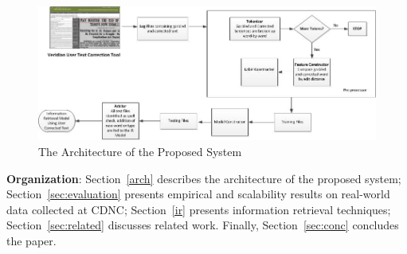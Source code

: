 \documentclass[letterpaper]{article}
\begin{document}
\begin{figure}[t]
\centering
\includegraphics[width=0.8\textheight]{./image/archOCR.jpg}
\caption{The Architecture of the Proposed System}
\label{fig:arch}
\end{figure}



\noindent \textbf{Organization}: Section~\ref{arch} describes the architecture of the proposed system; Section~\ref{sec:evaluation} presents empirical and scalability results on real-world data collected at CDNC; Section~\ref{ir} presents information retrieval techniques; Section~\ref{sec:related} discusses related work. Finally, Section~\ref{sec:conc} concludes the paper.
\end{document}
